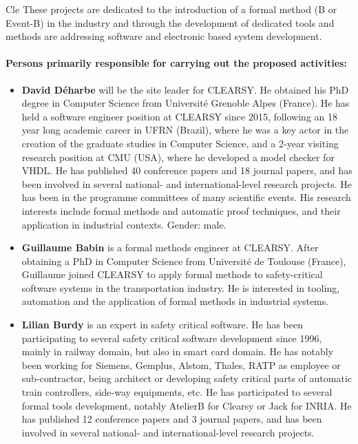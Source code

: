 \begin{sitedescription}{Cle}
These projects are dedicated to the introduction of a formal method (B or Event-B) in the industry and through the development
of dedicated tools and methods are addressing software and electronic based system development.

\paragraph{Persons primarily responsible for carrying out the proposed activities:}

\begin{itemize}
\item\textbf{David Déharbe} will be the site leader for CLEARSY. He obtained his PhD degree in Computer Science from Université Grenoble Alpes 
(France). He has held a software engineer position at CLEARSY since 2015, following an 18 year long academic career in UFRN (Brazil), 
where he was a key actor in the creation of the graduate studies in Computer Science, and a 2-year visiting research position at CMU 
(USA), where he developed a model checker for VHDL. He has published 40 conference papers and 18 journal papers, and has been involved 
in several national- and international-level research projects. He has been in the programme committees of many scientific events. His 
research interests include formal methods and automatic proof techniques, and their application in industrial contexts. Gender: male.

\item\textbf{Guillaume Babin} is a formal methods engineer at CLEARSY. After obtaining a PhD in Computer Science from Université de 
Toulouse (France), Guillaume joined CLEARSY to apply formal methods to safety-critical software systems in the transportation industry. 
He is interested in tooling, automation and the application of formal methods in industrial systems.

\item\textbf{Lilian Burdy} is an expert in safety critical software. He has been participating to several safety critical software 
development since 1996, mainly in railway domain, but also in smart card domain. He has notably been working for Siemens, Gemplus, 
Alstom, Thales, RATP as employee or sub-contractor, being architect or developing safety critical parts of automatic train controllers, 
side-way equipments, etc. He has participated to several formal tools development, notably AtelierB for Clearsy or Jack for INRIA. He 
has published 12 conference papers and 3 journal papers, and has been involved in several national- and international-level research 
projects.


\end{itemize}
\end{sitedescription}
